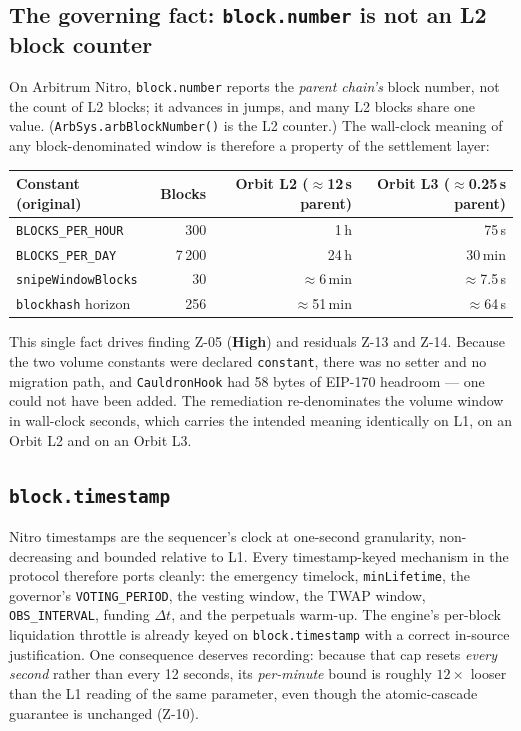 \documentclass[10pt,a4paper]{article}
\newcommand{\sev}[2]{\textcolor{#1}{\textbf{#2}}}
\newcommand{\SevHigh}{\sev{high}{High}}
\newcommand{\code}[1]{\texttt{\small #1}}
\begin{document}
\subsection{The governing fact: \code{block.number} is not an L2 block counter}
On Arbitrum Nitro, \code{block.number} reports the \emph{parent chain's} block number, not
the count of L2 blocks; it advances in jumps, and many L2 blocks share one value.
(\code{ArbSys.arbBlockNumber()} is the L2 counter.) The wall-clock meaning of any
block-denominated window is therefore a property of the settlement layer:

\begin{center}\small
\begin{tabular}{@{}lrrr@{}}
\toprule
\textbf{Constant (original)} & \textbf{Blocks} & \textbf{Orbit L2 ($\approx$12\,s parent)} & \textbf{Orbit L3 ($\approx$0.25\,s parent)} \\
\midrule
\code{BLOCKS\_PER\_HOUR} & 300 & 1\,h & 75\,s \\
\code{BLOCKS\_PER\_DAY} & 7\,200 & 24\,h & 30\,min \\
\code{snipeWindowBlocks} & 30 & $\approx$6\,min & $\approx$7.5\,s \\
\code{blockhash} horizon & 256 & $\approx$51\,min & $\approx$64\,s \\
\bottomrule
\end{tabular}
\end{center}

\noindent
This single fact drives finding Z-05 (\SevHigh) and residuals Z-13 and Z-14. Because the
two volume constants were declared \code{constant}, there was no setter and no migration
path, and \code{CauldronHook} had 58 bytes of EIP-170 headroom --- one could not have been
added. The remediation re-denominates the volume window in wall-clock seconds, which
carries the intended meaning identically on L1, on an Orbit L2 and on an Orbit L3.

\subsection{\code{block.timestamp}}
Nitro timestamps are the sequencer's clock at one-second granularity, non-decreasing and
bounded relative to L1. Every timestamp-keyed mechanism in the protocol therefore ports
cleanly: the emergency timelock, \code{minLifetime}, the governor's \code{VOTING\_PERIOD},
the vesting window, the TWAP window, \code{OBS\_INTERVAL}, funding $\Delta t$, and the
perpetuals warm-up. The engine's per-block liquidation throttle is already keyed on
\code{block.timestamp} with a correct in-source justification. One consequence deserves
recording: because that cap resets \emph{every second} rather than every 12 seconds, its
\emph{per-minute} bound is roughly $12\times$ looser than the L1 reading of the same
parameter, even though the atomic-cascade guarantee is unchanged (Z-10).
\end{document}
